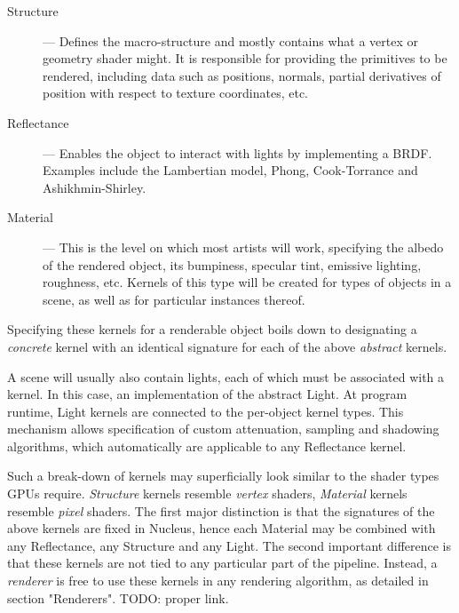 \begin{description}

\item[Structure] --- Defines the macro-structure and mostly contains what a vertex or geometry shader might. It is responsible for providing the primitives to be rendered, including data such as positions, normals, partial derivatives of position with respect to texture coordinates, etc.

\item[Reflectance] --- Enables the object to interact with lights by implementing a BRDF. Examples include the Lambertian model, Phong, Cook-Torrance and Ashikhmin-Shirley.

\item[Material] --- This is the level on which most artists will work, specifying the albedo of the rendered object, its bumpiness, specular tint, emissive lighting, roughness, etc. Kernels of this type will be created for types of objects in a scene, as well as for particular instances thereof.

\end{description}

Specifying these kernels for a renderable object boils down to designating a \emph{concrete} kernel with an identical signature for each of the above \emph{abstract} kernels.

A scene will usually also contain lights, each of which must be associated with a kernel. In this case, an implementation of the abstract Light. At program runtime, Light kernels are connected to the per-object kernel types. This mechanism allows specification of custom attenuation, sampling and shadowing algorithms, which automatically are applicable to any Reflectance kernel.


Such a break-down of kernels may superficially look similar to the shader types GPUs require. \emph{Structure} kernels resemble \emph{vertex} shaders, \emph{Material} kernels resemble \emph{pixel} shaders. The first major distinction is that the signatures of the above kernels are fixed in Nucleus, hence each Material may be combined with any Reflectance, any Structure and any Light. The second important difference is that these kernels are not tied to any particular part of the pipeline. Instead, a \emph{renderer} is free to use these kernels in any rendering algorithm, as detailed in section "Renderers". TODO: proper link.

